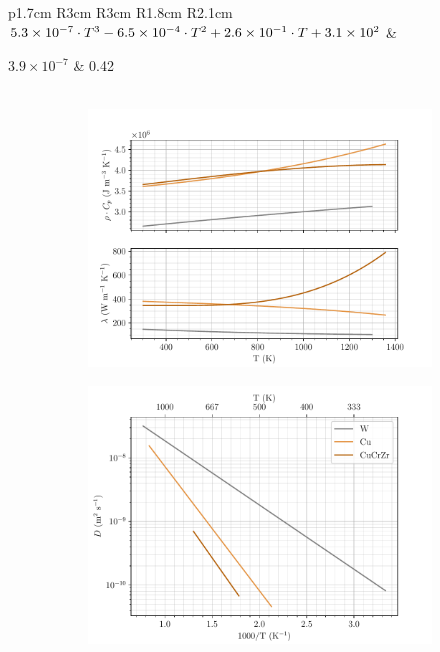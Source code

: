 \begin{table}[ht]
\begin{tabular}{p{1.7cm}  R{3cm}  R{3cm}  R{1.8cm}  R{2.1cm} }
        $5.3\times 10^{-7}\cdot T^3\newline %
        -6.5\times 10^{-4}\cdot T^2\newline %
        +2.6\times 10^{-1}\cdot T\newline %
        +3.1\times 10^2$ & %

        $3.9\times 10^{-7}$ & %
        0.42\\
        \\
    \end{tabular}
    \caption{Materials properties used in the simulations. Thermal properties are fitted from ANSYS. \cite{reiter_compilation_1996, serra_hydrogen_1998, fernandez_hydrogen_2015}}
    \label{tab:materials properties}
\end{table}

\begin{figure} [h!]
    \centering
    \begin{subfigure}{0.5\linewidth}
        \centering
        \includegraphics[width=\linewidth]{Figures/Chapter3/monoblocks/parametric_study/thermal_prop.pdf}
        \label{fig:thermal prop}
    \end{subfigure}%
    \begin{subfigure}{0.5\linewidth}
        \centering
        \includegraphics[width=\linewidth]{Figures/Chapter3/monoblocks/parametric_study/D_coeff.pdf}

\end{subfigure}
\end{figure}
